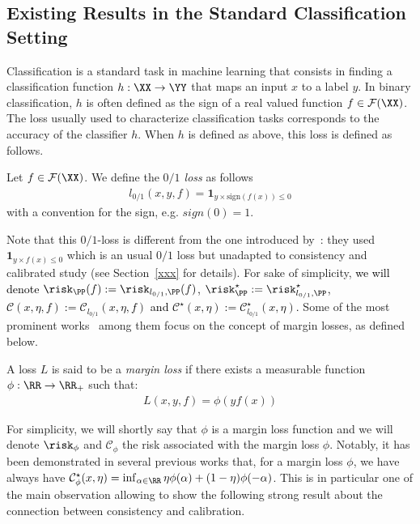 \subsection{Existing Results in the Standard Classification Setting}

Classification is a standard task in machine learning that consists in finding a classification function $h:\XX\to\YY$ that maps an input $x$ to a label $y$. In binary classification, $h$ is often defined as the sign of a real valued function $f \in \mathcal{F}(\XX)$. The loss usually used to characterize classification tasks corresponds to the accuracy of the classifier $h$. When $h$ is defined as above, this loss is defined as follows.




\begin{definition}[$0/1$ loss]
Let $f \in \mathcal{F}(\XX)$. We define the \emph{$0/1$ loss} as follows
\begin{align*}
     l_{0/1}(x,y,f)=\mathbf{1}_{y\times\text{sign}(f(x))\leq 0}
\end{align*}
 with a convention for the sign, e.g. $sign(0) = 1$.
\end{definition}

Note that this $0/1$-loss is different from the one introduced by~\citet{bao2020calibrated,awasthi2021calibration,awasthi2021finer}: they used $\mathbf{1}_{y\times f(x)\leq 0}$ which is an usual $0/1$ loss but unadapted to consistency and calibrated study (see Section~\ref{xxx} for details). For sake of simplicity, \textcolor{black}{ we will denote $\risk_{\PP}(f) :=\risk_{l_{0/1},\PP}(f)$,  $\risk_{\PP}^\star :=\risk_{l_{0/1},\PP}^\star$, $\mathcal{C}(x,\eta,f):= \mathcal{C}_{l_{0/1}}(x,\eta,f)$ and $\mathcal{C}^\star(x,\eta):= \mathcal{C}^\star_{l_{0/1}}(x,\eta)$.}  Some of the most prominent works~\citep{zhang2004statistical,bartlett2006convexity,steinwart2007compare} among them focus on the concept of margin losses, as defined below. 

\begin{definition}
A loss $L$ is said to be a \emph{margin loss} if there exists a measurable function $\phi:\RR\to\RR_+$ such that: 
\begin{align*}
    L(x,y,f) = \phi(yf(x))
\end{align*}
\end{definition}
For simplicity, we will shortly say that $\phi$ is a margin loss function and we will denote $\risk_\phi$ and $\mathcal{C}_\phi$ the risk associated with the margin loss $\phi$. Notably, it has been demonstrated in several previous works\citet{zhang2004statistical,bartlett2006convexity,steinwart2007compare} that, for a margin loss $\phi$, we have always have
$ \mathcal{C}^\star_\phi(x,\eta) = \inf_{\alpha\in\RR}\eta \phi(\alpha)+(1-\eta)\phi(-\alpha)$. This is in particular one of the main observation allowing to show the following strong result about the connection between consistency and calibration.

